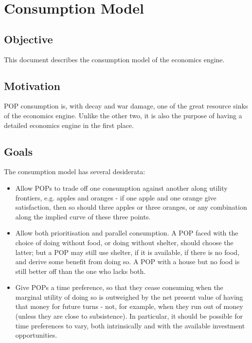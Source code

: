 \documentclass[12pt]{book}
\begin{document}
\chapter{Consumption Model}

\section{Objective}

This document describes the consumption model of the economics engine.

\section{Motivation}

POP consumption is, with decay and war damage, one of the great
resource sinks of the economics engine. Unlike the other two, it is
also the purpose of having a detailed economics engine in the first
place. 

\section{Goals}

The consumption model has several desiderata:
\begin{itemize}
\item Allow POPs to trade off one consumption against another along
  utility frontiers, e.g. apples and oranges - if one apple and one
  orange give satisfaction, then so should three apples or three
  oranges, or any combination along the implied curve of these three
  points.
\item Allow both prioritisation and parallel consumption. A POP faced
  with the choice of doing without food, or doing without shelter,
  should choose the latter; but a POP may still use shelter, if it is
  available, if there is no food, and derive some benefit from doing
  so. A POP with a house but no food is still better off than the one
  who lacks both.
\item Give POPs a time preference, so that they cease consuming when
  the marginal utility of doing so is outweighed by the net present
  value of having that money for future turns - not, for example, when
  they run out of money (unless they are close to subsistence). In
  particular, it should be possible for time preferences to vary, both
  intrinsically and with the available investment opportunities.
\end{itemize}
\end{document}
